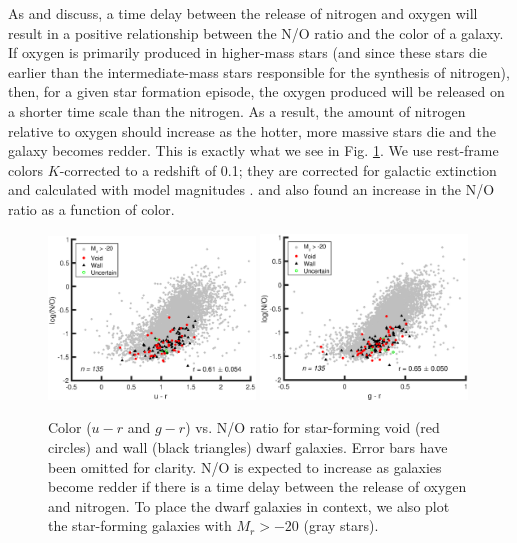 As \cite{vanZee06a} and \cite{Berg12} discuss, a time delay between the release 
of nitrogen and oxygen will result in a positive relationship between the N/O 
ratio and the color of a galaxy.  If oxygen is primarily produced in higher-mass 
stars (and since these stars die earlier than the intermediate-mass stars 
responsible for the synthesis of nitrogen), then, for a given star formation 
episode, the oxygen produced will be released on a shorter time scale than the 
nitrogen.  As a result, the amount of nitrogen relative to oxygen should 
increase as the hotter, more massive stars die and the galaxy becomes redder.  
This is exactly what we see in Fig. \ref{fig:color_NO}.  We use rest-frame 
colors $K$-corrected to a redshift of 0.1; they are corrected for galactic 
extinction and calculated with model magnitudes \citep{Choi10}.  
\cite{vanZee06a} and \cite{Berg12} also found an increase in the N/O ratio as a 
function of color.

\begin{figure}
    \includegraphics[width=0.49\textwidth]{Images/Paper2/ur_NO_1sig_I06_dwarf_0-20_SF_t3}
    \includegraphics[width=0.49\textwidth]{Images/Paper2/gr_NO_1sig_I06_dwarf_0-20_SF_t3}
    \caption[Color versus N/O for 135 dwarf galaxy sample]{Color ($u-r$ and 
    $g-r$) vs. N/O ratio for star-forming void (red circles) and wall (black 
    triangles) dwarf galaxies.  Error bars have been omitted for clarity.  N/O 
    is expected to increase as galaxies become redder if there is a time delay 
    between the release of oxygen and nitrogen.  To place the dwarf galaxies in 
    context, we also plot the star-forming galaxies with $M_r > -20$ 
    (gray stars).}
    \label{fig:color_NO}
\end{figure}


